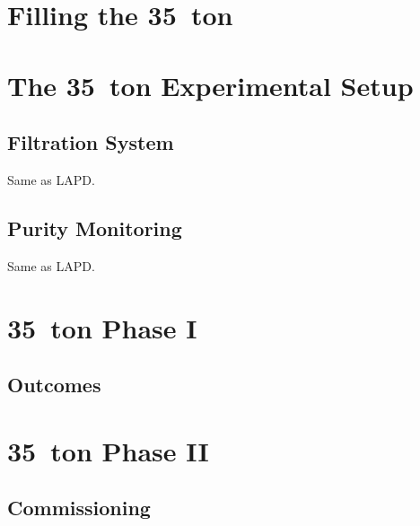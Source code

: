 \section{Filling the 35~ton}\label{sec:35tonFilling}

\section{The 35~ton Experimental Setup}\label{sec:35tonExperiment}

\subsection{Filtration System}\label{sec:35tonFiltration}

Same as LAPD.

\subsection{Purity Monitoring}\label{sec:35tonPurity}

Same as LAPD.

\section{35~ton Phase I}\label{sec:35tonPhaseI}

\subsection{Outcomes}\label{sec:35tonPhaseIOutcomes}

\section{35~ton Phase II}\label{sec:35tonPhaseII}

\subsection{Commissioning}\label{sec:35tonCommissioning}

